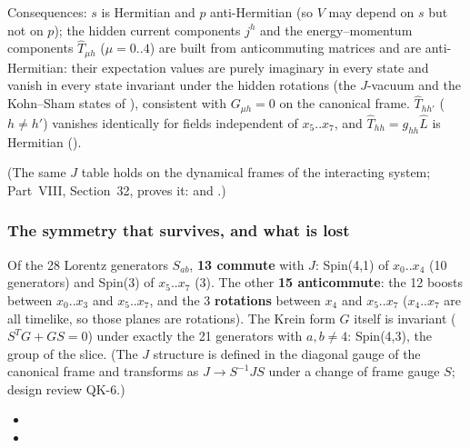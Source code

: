 Consequences: $s$ is Hermitian and $p$ anti-Hermitian (so $V$ may depend on $s$ but not on $p$); the
hidden current components $j^h$ and the energy--momentum components $\hat T_{\mu h}$ ($\mu=0..4$) are
built from anticommuting matrices and are anti-Hermitian: their expectation values are purely
imaginary in every state and vanish in every state invariant under the hidden rotations (the
$J$-vacuum and the Kohn--Sham states of ), consistent with $G_{\mu h}=0$ on the
canonical frame. $\hat T_{hh'}$ ($h\neq h'$) vanishes identically for fields independent of
$x_5..x_7$, and $\hat T_{hh}=g_{hh}\hat L$ is Hermitian ().

(The same $J$ table holds on the dynamical frames of the interacting system; Part~VIII, Section~32,
proves it:  and .)

\subsubsection{The symmetry that survives, and what is lost}
\label{sec:3.5.9}

Of the 28 Lorentz generators $S_{ab}$, \textbf{13 commute} with $J$: Spin(4,1) of $x_0..x_4$ (10
generators) and Spin(3) of $x_5..x_7$ (3). The other \textbf{15 anticommute}: the 12 boosts between
$x_0..x_3$ and $x_5..x_7$, and the 3 \textbf{rotations} between $x_4$ and $x_5..x_7$ ($x_4..x_7$ are
all timelike, so those planes are rotations). The Krein form $G$ itself is invariant
($S^{T}G+GS=0$) under exactly the 21 generators with $a,b\neq4$: Spin(4,3), the group of the slice.
 (The $J$ structure is defined in the diagonal gauge of the canonical frame and
transforms as $J\to S^{-1}JS$ under a change of frame gauge $S$; design review QK-6.)
\begin{itemize}
  \item {}
  \item {}
\end{itemize}

